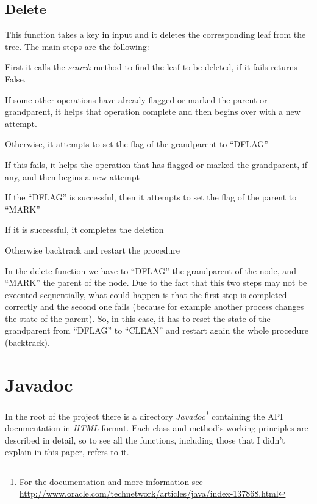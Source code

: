 \documentclass[a4paper]{article}
\begin{document}
\subsection{Delete}
This function takes a key in input and it deletes the corresponding leaf from the tree. The main steps are the following:
\begin{compactitem}
  \item First it calls the \emph{search} method to find the leaf to be deleted, if it fails returns False.
  \item If some other operations have already flagged or marked the parent or grandparent, it helps that operation complete and then begins over with a new attempt.
  \item Otherwise, it attempts to set the flag of the grandparent to ``DFLAG'' 
    \begin{compactitem}
      \item If this fails, it helps the operation that has flagged or marked the grandparent, if any, and then begins a new attempt
      \item If the ``DFLAG'' is successful, then it attempts to set the flag of the parent to ``MARK''
      \begin{compactitem}
        \item If it is successful, it completes the deletion
        \item Otherwise backtrack and restart the procedure
      \end{compactitem}
    \end{compactitem}
\end{compactitem}

In the delete function we have to ``DFLAG'' the grandparent of the node, and ``MARK'' the parent of the node. Due to the fact that this two steps may not be executed sequentially, what could happen is that the first step is completed correctly and the second one fails (because for example another process changes the state of the parent). So, in this case, it has to reset the state of the grandparent from ``DFLAG'' to ``CLEAN'' and restart again the whole procedure (backtrack).


\section{Javadoc}
\label{sec:javadoc}
In the root of the project there is a directory \emph{Javadoc\footnote{For the documentation and more information see \url{http://www.oracle.com/technetwork/articles/java/index-137868.html}}} containing the API documentation in \emph{HTML} format.
Each class and method's working principles are described in detail, so to see all the functions, including those that I didn't explain in this paper, refers to it.
\end{document}
